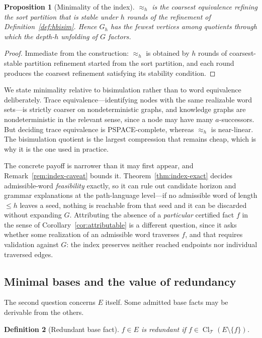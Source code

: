\documentclass[11pt]{article}
\newtheorem{definition}{Definition}[section]
\newtheorem{proposition}[definition]{Proposition}
\newcommand{\Cl}{\operatorname{Cl}}
\newcommand{\T}{\mathcal{T}}
\begin{document}
\begin{proposition}[Minimality of the index]
\label{prop:index-min}
$\approx_h$ is the coarsest equivalence refining the sort partition that is stable under $h$ rounds of the refinement of Definition~\ref{def:hbisim}. Hence $G_h$ has the fewest vertices among quotients through which the depth-$h$ unfolding of $G$ factors.
\end{proposition}
\begin{proof}
Immediate from the construction: $\approx_h$ is obtained by $h$ rounds of coarsest-stable partition refinement started from the sort partition, and each round produces the coarsest refinement satisfying its stability condition.
\end{proof}

We state minimality relative to bisimulation rather than to word equivalence deliberately. Trace equivalence---identifying nodes with the same realizable word sets---is strictly coarser on nondeterministic graphs, and knowledge graphs are nondeterministic in the relevant sense, since a node may have many $a$-successors. But deciding trace equivalence is PSPACE-complete, whereas $\approx_h$ is near-linear. The bisimulation quotient is the largest compression that remains cheap, which is why it is the one used in practice.

The concrete payoff is narrower than it may first appear, and Remark~\ref{rem:index-caveat} bounds it. Theorem~\ref{thm:index-exact} decides admissible-word \emph{feasibility} exactly, so it can rule out candidate horizon and grammar explanations at the path-language level---if no admissible word of length $\le h$ leaves a seed, nothing is reachable from that seed and it can be discarded without expanding $G$. Attributing the absence of a \emph{particular} certified fact $f$ in the sense of Corollary~\ref{cor:attributable} is a different question, since it asks whether some realization of an admissible word traverses $f$, and that requires validation against $G$: the index preserves neither reached endpoints nor individual traversed edges.

\subsection{Minimal bases and the value of redundancy}
\label{sec:basemin}

The second question concerns $E$ itself. Some admitted base facts may be derivable from the others.

\begin{definition}[Redundant base fact]
$f\in E$ is \emph{redundant} if $f\in\Cl_{\T}(E\setminus\{f\})$.
\end{definition}
\end{document}
